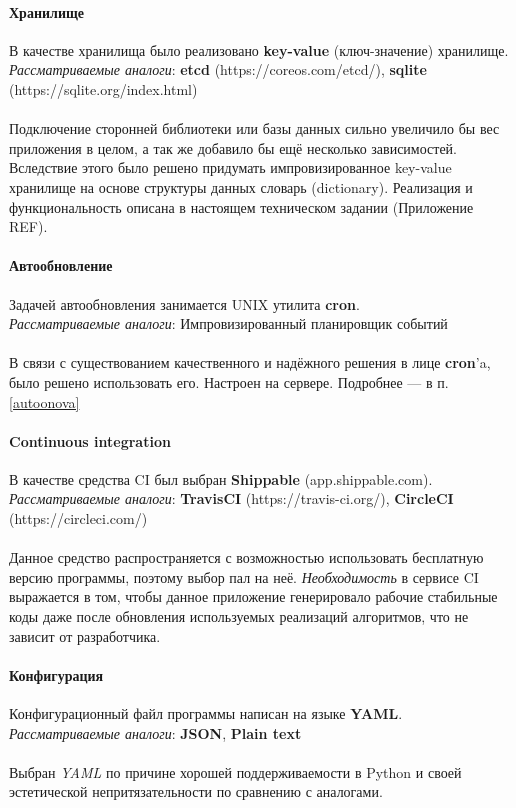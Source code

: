 \paragraph{Хранилище}
В качестве хранилища было реализовано \textbf{key-value} (ключ-значение) хранилище.\\
\emph{Рассматриваемые аналоги}: \textbf{etcd} (https://coreos.com/etcd/), \textbf{sqlite} (https://sqlite.org/index.html)\\\\
Подключение сторонней библиотеки или базы данных сильно увеличило бы вес
приложения в целом, а так же добавило бы ещё несколько зависимостей. Вследствие
этого было решено придумать импровизированное key-value хранилище на основе
структуры данных словарь (dictionary).
Реализация и функциональность описана в настоящем техническом задании
(Приложение REF).

\paragraph{Автообновление}
Задачей автообновления занимается UNIX утилита \textbf{cron}.\\
\emph{Рассматриваемые аналоги}: Импровизированный планировщик событий\\\\
В связи с существованием качественного и надёжного решения в лице
\textbf{cron}'a, было решено использовать его. Настроен на сервере. Подробнее
--- в п. \ref{autoonova}

\paragraph{Continuous integration}
В качестве средства CI был выбран \textbf{Shippable} (app.shippable.com).\\
\emph{Рассматриваемые аналоги}: \textbf{TravisCI} (https://travis-ci.org/), \textbf{CircleCI} (https://circleci.com/)\\\\
Данное средство распространяется с возможностью использовать бесплатную версию
программы, поэтому выбор пал на неё. \emph{Необходимость} в сервисе CI
выражается в том, чтобы данное приложение генерировало рабочие стабильные коды
даже после обновления используемых реализаций алгоритмов, что не зависит от
разработчика.

\paragraph{Конфигурация}
Конфигурационный файл программы написан на языке \textbf{YAML}.\\
\emph{Рассматриваемые аналоги}: \textbf{JSON}, \textbf{Plain text}\\\\
Выбран \emph{YAML} по причине хорошей поддерживаемости в Python и своей эстетической
непритязательности по сравнению с аналогами.



